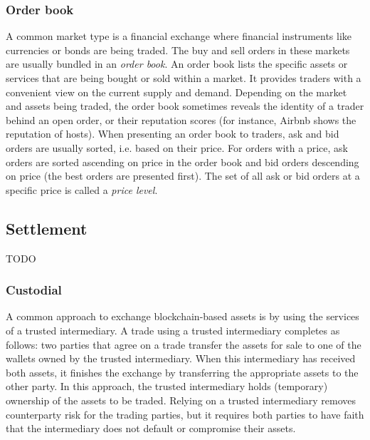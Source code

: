 \subsubsection{Order book}
A common market type is a financial exchange where financial instruments like currencies or bonds are being traded.
The buy and sell orders in these markets are usually bundled in an \emph{order book}.
An order book lists the specific assets or services that are being bought or sold within a market.
It provides traders with a convenient view on the current supply and demand.
Depending on the market and assets being traded, the order book sometimes reveals the identity of a trader behind an open order, or their reputation scores (for instance, Airbnb shows the reputation of hosts).
When presenting an order book to traders, ask and bid orders are usually sorted, i.e. based on their price.
For orders with a price, ask orders are sorted ascending on price in the order book and bid orders descending on price (the best orders are presented first).
The set of all ask or bid orders at a specific price is called a \emph{price level}.

\subsection{Settlement}
TODO

\subsubsection{Custodial}
A common approach to exchange blockchain-based assets is by using the services of a trusted intermediary.
A trade using a trusted intermediary completes as follows: two parties that agree on a trade transfer the assets for sale to one of the wallets owned by the trusted intermediary.
When this intermediary has received both assets, it finishes the exchange by transferring the appropriate assets to the other party.
In this approach, the trusted intermediary holds (temporary) ownership of the assets to be traded.
Relying on a trusted intermediary removes counterparty risk for the trading parties, but it requires both parties to have faith that the intermediary does not default or compromise their assets.

